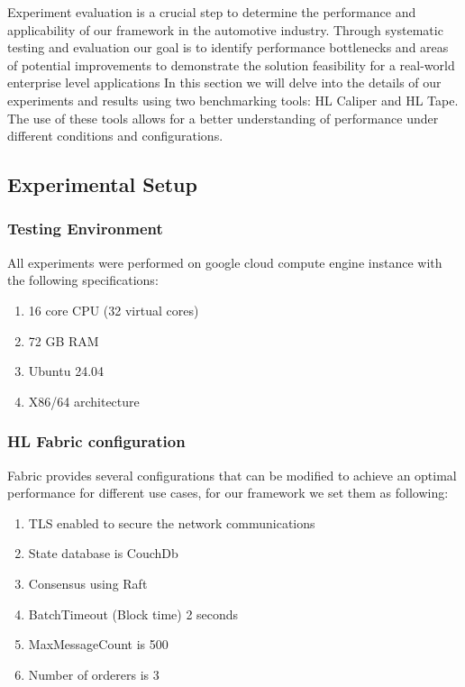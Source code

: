 Experiment evaluation is a crucial step to determine the performance and applicability of our framework in the automotive industry. Through
systematic testing and evaluation our goal is to identify performance bottlenecks and areas of potential improvements to demonstrate the
solution feasibility for a real-world enterprise level applications In this section we will delve into the details of our experiments and
results using two benchmarking tools: HL Caliper and HL Tape. The use of these tools allows for a better understanding of performance under
different conditions and configurations.

\subsection{Experimental Setup}

\subsubsection{Testing Environment}
All experiments were performed on google cloud compute engine instance with the following specifications:
\begin{enumerate}
	\item 16 core CPU (32 virtual cores)
	\item 72 GB RAM
	\item Ubuntu 24.04
	\item X86/64 architecture
\end{enumerate}

\subsubsection{HL Fabric configuration}
Fabric provides several configurations that can be modified to achieve an optimal performance for different use cases, for our
framework
we set them as following:
\begin{enumerate}
	\item  TLS enabled to secure the network communications
	\item State database is CouchDb
	\item Consensus using Raft
	\item BatchTimeout (Block time) 2 seconds
	\item MaxMessageCount is 500
	\item Number of orderers is 3
\end{enumerate}

